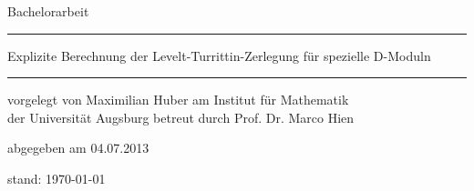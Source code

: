 \begin{titlepage}
  \thispagestyle{empty}
  \newcommand{\Rule}{%
    \textcolor{black}{\rule{\textwidth}{0.5mm}}%
  }
  \begin{center}\sffamily
    \normalfont\sffamily\large
    Bachelorarbeit
    \Rule
    \vspace{5mm}
    \Huge{Explizite Berechnung der Levelt-Turrittin-Zerlegung für spezielle
      D-Moduln}
    \vspace{1mm}
    \Rule
  \end{center}
    \vfill
    \normalfont\sffamily\large vorgelegt von
    \Large Maximilian Huber
    \vfill
    \normalfont\sffamily\large am
    \Large Institut für Mathematik\\
    \normalfont\sffamily\large der
    \Large Universität Augsburg
    \vfill
    \normalfont\sffamily\large betreut durch 
    \Large Prof. Dr. Marco Hien \par
    \vfill
    \normalfont\sffamily\large abgegeben am 
    \Large 04.07.2013\\
  \ifnum{}
    \begin{center}
      \normalfont\sffamily\large stand: \today
    \end{center}
  \fi
\end{titlepage}
